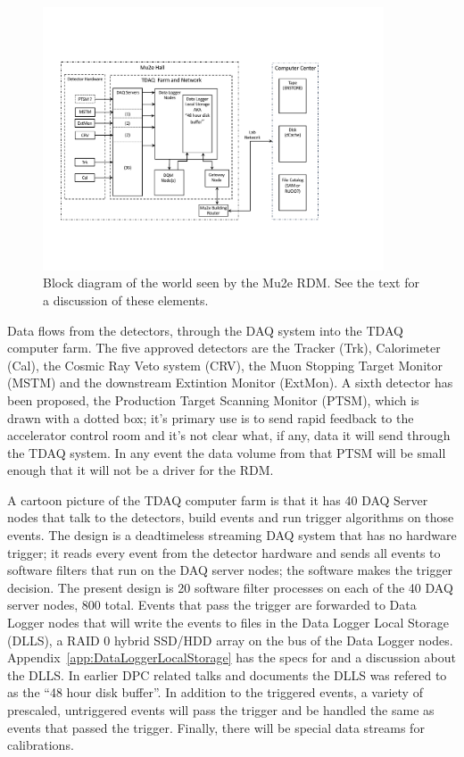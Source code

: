 \begin{figure}[tbp]
\centering
\includegraphics[width=0.9\textwidth]{figures/interface_with_TDAQ.pdf}
\caption[Block diagram of interfaces seen by the Mu2e RDM]{
  Block diagram of the world seen by the Mu2e RDM.
  See the text for a discussion of these elements.}
\label{fig:blockdiagram}
\end{figure}

Data flows from the detectors, through the DAQ system into the TDAQ computer farm.
The five approved detectors are the Tracker (Trk), Calorimeter (Cal), the Cosmic Ray Veto system (CRV),
the Muon Stopping Target Monitor (MSTM) and the downstream Extintion Monitor (ExtMon).
A sixth detector has been proposed, the Production Target Scanning Monitor (PTSM),
which is drawn with a dotted box;
it's primary use is to send rapid feedback to the accelerator control room
and it's not clear what, if any, data it will send through the TDAQ system.
In any event the data volume from that PTSM will be small enough that it will not be
a driver for the RDM.

A cartoon picture of the TDAQ computer farm is that it has 40 DAQ Server nodes
that talk to the detectors, build events and run trigger algorithms on those events.
The design is a deadtimeless streaming DAQ system that has no hardware trigger;
it reads every event from the detector hardware and sends all events to software filters
that run on the DAQ server nodes;
the software makes the trigger decision.
The present design is 20 software filter processes on each of the 40 DAQ server nodes, 800 total.
Events that pass the trigger are forwarded to Data Logger nodes that will write the events
to files in the Data Logger Local Storage (DLLS), a RAID 0 hybrid SSD/HDD array on the bus of the Data Logger nodes.
Appendix~\ref{app:DataLoggerLocalStorage} has the specs for and a discussion about the DLLS.
In earlier DPC related talks and documents the DLLS  was refered to as the ``48 hour disk buffer''.
In addition to the triggered events, a variety of prescaled, untriggered events will pass the
trigger and be handled the same as events that passed the trigger.
Finally, there will be special data streams for calibrations.

